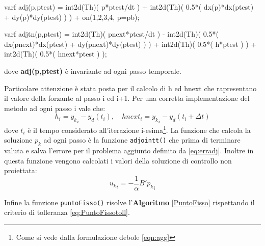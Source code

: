 \begin{Code}[caption={Matrici \texttt{adj(w,wtest)} e \texttt{adjtn(w,wtest)}}]
varf adj(p,ptest) =   int2d(Th)( p*ptest/dt )			
					+ int2d(Th)( 0.5*( dx(p)*dx(ptest) + dy(p)*dy(ptest) ) ) 
				    + on(1,2,3,4, p=pb);

varf adjtn(p,ptest) =   int2d(Th)( pnext*ptest/dt )
    				  - int2d(Th)( 0.5*( dx(pnext)*dx(ptest) + dy(pnext)*dy(ptest) ) ) 
  					  + int2d(Th)( 0.5*( h*ptest ) ) 
  					  + int2d(Th)( 0.5*( hnext*ptest ) ); 
\end{Code}
dove \textbf{adj(p,ptest)} è invariante ad ogni passo temporale.
\par
Particolare attenzione è stata posta per il calcolo di h ed hnext che rapresentano il valore della forzante al passo i ed i+1. Per una corretta implementazione del metodo ad ogni passo i vale che:
\begin{equation}
h_i = {y_k}_i - y_d(t_i), \quad
hnext_i = {y_k}_i - y_d(t_i+{\Delta}t)
\label{hhnext}
\end{equation}
dove $t_i$ è il tempo considerato all'iterazione i-esima\footnote{Come si vede dalla formulazione debole \eqref{eqn:agg}}.
La funzione che calcola la soluzione $p_k$ ad ogni passo è la funzione \texttt{adjointt()} che prima di terminare valuta e salva l'errore per il problema aggiunto definito da \eqref{eq:erradj}. Inoltre in questa funzione vengono calcolati i valori della soluzione di controllo non proiettata:
\begin{equation}
{u_k}_i = -\frac{1}{\alpha}B'{p_k}_i  %
\label{unp}
\end{equation}
\par
Infine la funzione \texttt{puntoFisso()} risolve l'\textbf{Algoritmo} \ref{PuntoFisso} rispettando il criterio di tolleranza \eqref{eq:PuntoFissotoll}.

